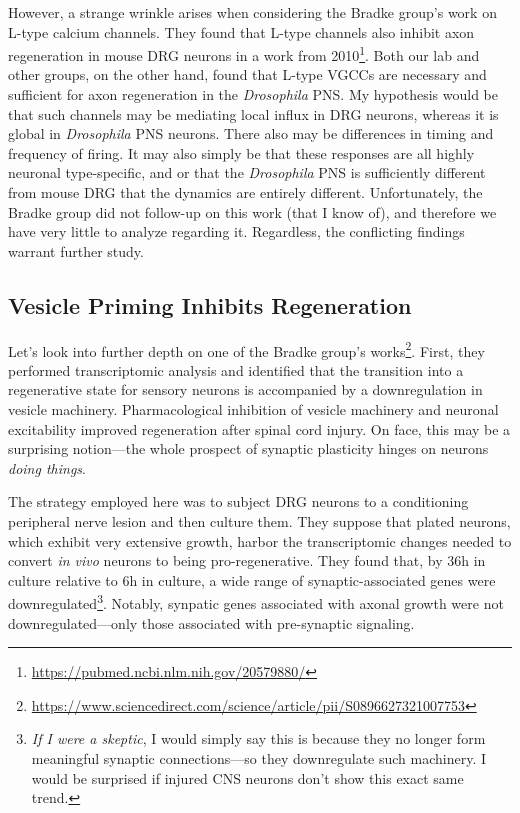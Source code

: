 However, a strange wrinkle arises when considering the Bradke group's work on L-type calcium channels. They found that L-type channels also inhibit axon regeneration in mouse DRG neurons in a work from 2010\footnote{\url{https://pubmed.ncbi.nlm.nih.gov/20579880/}}. Both our lab and other groups, on the other hand, found that L-type VGCCs are necessary and sufficient for axon regeneration in the \textit{Drosophila} PNS. My hypothesis would be that such channels may be mediating local influx in DRG neurons, whereas it is global in \textit{Drosophila} PNS neurons. There also may be differences in timing and frequency of firing. It may also simply be that these responses are all highly neuronal type-specific, and or that the \textit{Drosophila} PNS is sufficiently different from mouse DRG that the dynamics are entirely different. Unfortunately, the Bradke group did not follow-up on this work (that I know of), and therefore we have very little to analyze regarding it. Regardless, the conflicting findings warrant further study.


\subsection{Vesicle Priming Inhibits Regeneration}

Let's look into further depth on one of the Bradke group's works\footnote{\url{https://www.sciencedirect.com/science/article/pii/S0896627321007753}}. First, they performed transcriptomic analysis and identified that the transition into a regenerative state for sensory neurons is accompanied by a downregulation in vesicle machinery. Pharmacological inhibition of vesicle machinery and neuronal excitability improved regeneration after spinal cord injury. On face, this may be a surprising notion---the whole prospect of synaptic plasticity hinges on neurons \textit{doing things}.\newline

The strategy employed here was to subject DRG neurons to a conditioning peripheral nerve lesion and then culture them. They suppose that plated neurons, which exhibit very extensive growth, harbor the transcriptomic changes needed to convert \textit{in vivo} neurons to being pro-regenerative. They found that, by 36h in culture relative to 6h in culture, a wide range of synaptic-associated genes were downregulated\footnote{\textit{If I were a skeptic}, I would simply say this is because they no longer form meaningful synaptic connections---so they downregulate such machinery. I would be surprised if injured CNS neurons don't show this exact same trend.}. Notably, synpatic genes associated with axonal growth were not downregulated---only those associated with pre-synaptic signaling.\newline


